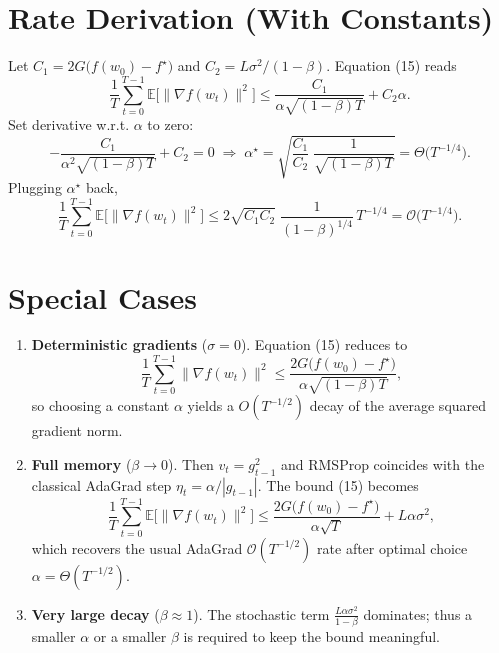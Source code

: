 \documentclass{article}
\newcommand{\E}{\mathbb{E}}
\begin{document}
\section*{Rate Derivation (With Constants)}
Let $C_{1}=2G\bigl(f(w_{0})-f^{\star}\bigr)$ and $C_{2}=L\sigma^{2}/(1-\beta)$.  
Equation (15) reads
\[
\frac{1}{T}\sum_{t=0}^{T-1}\E\!\big[\|\nabla f(w_{t})\|^{2}\big]
\le \frac{C_{1}}{\alpha\sqrt{(1-\beta)T}}+C_{2}\alpha.
\]
Set derivative w.r.t. $\alpha$ to zero:
\[
-\frac{C_{1}}{\alpha^{2}\sqrt{(1-\beta)T}}+C_{2}=0
\;\Longrightarrow\;
\alpha^{\star}= \sqrt{\frac{C_{1}}{C_{2}}\;\frac{1}{\sqrt{(1-\beta)T}}}
= \Theta\!\bigl(T^{-1/4}\bigr).
\]
Plugging $\alpha^{\star}$ back,
\[
\frac{1}{T}\sum_{t=0}^{T-1}\E\!\big[\|\nabla f(w_{t})\|^{2}\big]
\le 2\sqrt{C_{1}C_{2}}\;\frac{1}{(1-\beta)^{1/4}}\,T^{-1/4}
= \mathcal{O}\!\bigl(T^{-1/4}\bigr).
\]

\section*{Special Cases}
\begin{enumerate}
\item \textbf{Deterministic gradients} ($\sigma=0$).  
Equation (15) reduces to
\[
\frac{1}{T}\sum_{t=0}^{T-1}\|\nabla f(w_{t})\|^{2}
\le \frac{2G\bigl(f(w_{0})-f^{\star}\bigr)}{\alpha\sqrt{(1-\beta)T}},
\]
so choosing a constant $\alpha$ yields a $O(T^{-1/2})$ decay of the average squared gradient norm.
\item \textbf{Full memory} ($\beta\to0$).  
Then $v_{t}=g_{t-1}^{2}$ and RMSProp coincides with the classical AdaGrad step $\eta_{t}= \alpha/|g_{t-1}|$. The bound (15) becomes
\[
\frac{1}{T}\sum_{t=0}^{T-1}\E\!\big[\|\nabla f(w_{t})\|^{2}\big]
\le \frac{2G\bigl(f(w_{0})-f^{\star}\bigr)}{\alpha\sqrt{T}}+L\alpha\sigma^{2},
\]
which recovers the usual AdaGrad $\mathcal{O}(T^{-1/2})$ rate after optimal choice $\alpha=\Theta(T^{-1/2})$.
\item \textbf{Very large decay} ($\beta\approx1$).  
The stochastic term $\frac{L\alpha\sigma^{2}}{1-\beta}$ dominates; thus a smaller $\alpha$ or a smaller $\beta$ is required to keep the bound meaningful.
\end{enumerate}
\end{document}

